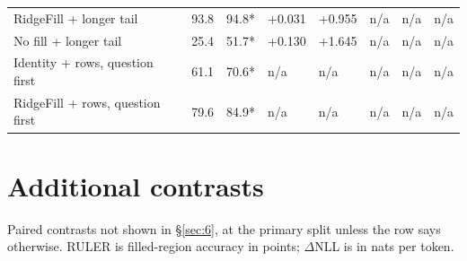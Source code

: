 \documentclass[11pt]{article}
\begin{document}
\begin{table}[H]
\begin{tabular}{llllllll}
RidgeFill + longer tail & 93.8 & 94.8* & +0.031 & +0.955 & n/\allowbreak{}a & n/\allowbreak{}a & n/\allowbreak{}a \\
No fill + longer tail & 25.4 & 51.7* & +0.130 & +1.645 & n/\allowbreak{}a & n/\allowbreak{}a & n/\allowbreak{}a \\
Identity + rows, question first & 61.1 & 70.6* & n/\allowbreak{}a & n/\allowbreak{}a & n/\allowbreak{}a & n/\allowbreak{}a & n/\allowbreak{}a \\
RidgeFill + rows, question first & 79.6 & 84.9* & n/\allowbreak{}a & n/\allowbreak{}a & n/\allowbreak{}a & n/\allowbreak{}a & n/\allowbreak{}a \\
\bottomrule
\end{tabular}
\end{table}


\section{Additional contrasts}\label{app:B}
Paired contrasts not shown in \S\ref{sec:6}, at the primary split unless the row says otherwise. RULER is filled-region accuracy in points; $\Delta$NLL is in nats per token.
\end{document}
